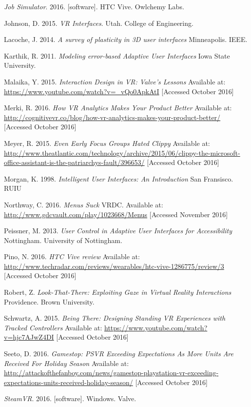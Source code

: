 \documentclass[12pt]{article}
\begin{document}
\emph{Job Simulator}. 2016. [software]. HTC Vive. Owlchemy Labs.

Johnson, D. 2015. \emph{VR Interfaces}. Utah. College of Engineering.

Lacoche, J. 2014. \emph{A survey of plasticity in 3D user interfaces} Minneapolis. IEEE. 

Karthik, R. 2011. \emph{Modeling error-based Adaptive User Interfaces} Iowa State University. 

Malaika, Y. 2015. \emph{Interaction Design in VR: Valve's Lessons } Available at: \url{https://www.youtube.com/watch?v=_vQo0ApkAtI} [Accessed October 2016]

Merki, R. 2016. \emph{How VR Analytics Makes Your Product Better} Available at: \url{http://cognitivevr.co/blog/how-vr-analytics-makes-your-product-better/} [Accessed October 2016]

Meyer, R. 2015. \emph{Even Early Focus Groups Hated Clippy} Available at: \url{http://www.theatlantic.com/technology/archive/2015/06/clippy-the-microsoft-office-assistant-is-the-patriarchys-fault/396653/} [Accessed October 2016]

Morgan, K. 1998. \emph{Intelligent User Interfaces: An Introduction} San Fransisco. RUIU 

Northway, C. 2016. \emph{Menus Suck} VRDC. Available at: \url{http://www.gdcvault.com/play/1023668/Menus} [Accessed November 2016]

Peissner, M. 2013. \emph{User Control in Adaptive User Interfaces for Accessibility} Nottingham. University of Nottingham.

Pino, N. 2016. \emph{HTC Vive review} Available at: \url{http://www.techradar.com/reviews/wearables/htc-vive-1286775/review/3} [Accessed October 2016]

Robert, Z. \emph{Look-That-There: Exploiting Gaze in Virtual Reality Interactions} Providence. Brown University. 

Schwartz, A. 2015. \emph{Being There: Designing Standing VR Experiences with Tracked Controllers} Available at: \url{https://www.youtube.com/watch?v=hjc7AJwZ4DI} [Accessed October 2016]

Seeto, D. 2016. \emph{Gamestop: PSVR Exceeding Expectations As More Units Are Received For Holiday Season} Available at: \url{http://attackofthefanboy.com/news/gamestop-playstation-vr-exceeding-expectations-units-received-holiday-season/} [Accessed October 2016]

\emph{SteamVR}. 2016. [software]. Windows. Valve.
\end{document}
